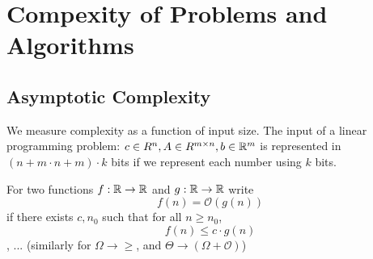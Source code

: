 \chapter{Compexity of Problems and Algorithms}
\label{cha:comp-probl-algor}

\section{Asymptotic Complexity}
\label{sec:asympt-compl}

We measure complexity as a function of input size.  The input of a
linear programming problem: $c \in R^{n}, A \in R^{m \times n}, b \in
\mathbb{R}^{m}$ is represented in $(n + m \cdot n + m) \cdot k$ bits if we
represent each number using $k$ bits.

For two functions $f: \mathbb{R} \rightarrow \mathbb{R}$ and $g: \mathbb{R} \rightarrow \mathbb{R}$
write
\begin{equation}
  \label{eq:27}
  f(n) = \mathcal{O}(g(n))
\end{equation}
if there exists $c, n_{0}$ such that for all $n \geq n_{0}$,
\begin{equation}
  \label{eq:27}
  f(n) \leq c \cdot g(n)
\end{equation}, ... (similarly for $\Omega \rightarrow \geq$, and
$\Theta \rightarrow (\Omega + \mathcal{O})$)

